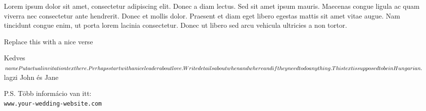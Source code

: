 \begin{minipage}[t]{0.45\textwidth}
  Lorem ipsum dolor sit amet, consectetur adipiscing elit. Donec a diam lectus. Sed sit amet ipsum mauris. Maecenas congue ligula ac quam viverra nec consectetur ante hendrerit. Donec et mollis dolor. Praesent et diam eget libero egestas mattis sit amet vitae augue. Nam tincidunt congue enim, ut porta lorem lacinia consectetur. Donec ut libero sed arcu vehicula ultricies a non tortor.

  \hfill Replace this with a nice verse

  \vspace{0.27\textheight}

  Kedves $name

  \vspace{0.5cm}
  Put actual invitation text here. Perhaps start with a nice leader about love.
  Write details about when and where and if they need to do anything.
  This text is supposed to be in Hungarian.

  $lagzi
  \vspace{0.5cm}
  John és Jane

  \vspace{1cm}
  P.S. Több informácio van itt:\\\texttt{www.your-wedding-website.com}
\end{minipage}
